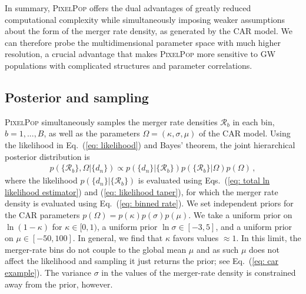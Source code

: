 \begin{refsection}
In summary, \textsc{PixelPop} offers the dual advantages of greatly reduced computational complexity while simultaneously imposing weaker assumptions about the form of the merger rate density, as generated by the CAR model. We can therefore probe the multidimensional parameter space with much higher resolution, a crucial advantage that makes \textsc{PixelPop} more sensitive to GW populations with complicated structures and parameter correlations.

\subsection{Posterior and sampling}
\label{sec: ppmethods Posterior and sampling}

\textsc{PixelPop} simultaneously samples the merger rate densities $\mathcal{R}_b$ in each bin, $b=1,...,B$, as well as the parameters $\Omega=(\kappa,\sigma,\mu)$ of the CAR model. Using the likelihood in Eq.~(\ref{eq: likelihood}) and Bayes' theorem, the joint hierarchical posterior distribution is
\begin{align}
\label{eq: posterior}
p ( \{\mathcal{R}_b\} , \Omega | \{d_n\} )
\propto
p ( \{d_n\} | \{\mathcal{R}_b\} )
p ( \{\mathcal{R}_b\} | \Omega )
p ( \Omega )
\, ,
\end{align}
where the likelihood $p ( \{d_n\} | \{\mathcal{R}_b\} )$ is evaluated using Eqs.~(\ref{eq: total ln likelihood estimator}) and (\ref{eq: likelihood taper}), for which the merger rate density is evaluated using Eq.~(\ref{eq: binned rate}). We set independent priors for the CAR parameters $p(\Omega)=p(\kappa)p(\sigma)p(\mu)$. We take a uniform prior on $\ln(1-\kappa)$ for $\kappa\in[0,1)$, a uniform prior $\ln\sigma\in[-3,5]$, and a uniform prior on $\mu\in[-50,100]$. In general, we find that $\kappa$ favors values $\approx1$. In this limit, the merger-rate bins do not couple to the global mean $\mu$ and as such $\mu$ does not affect the likelihood and sampling it just returns the prior; see Eq.~(\ref{eq: car example}). The variance $\sigma$ in the values of the merger-rate density is constrained away from the prior, however.


\end{refsection}
